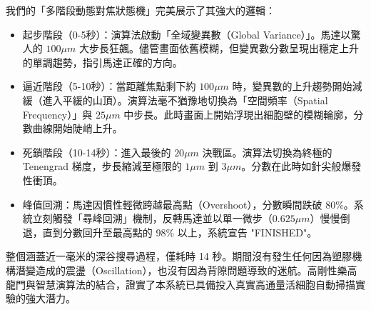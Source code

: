 我們的「多階段動態對焦狀態機」完美展示了其強大的邏輯：
\begin{itemize}
    \item 起步階段（0-5秒）：演算法啟動「全域變異數（Global Variance）」。馬達以驚人的 $100 \mu m$ 大步長狂飆。儘管畫面依舊模糊，但變異數分數呈現出穩定上升的單調趨勢，指引馬達正確的方向。
    \item 逼近階段（5-10秒）：當距離焦點剩下約 $100 \mu m$ 時，變異數的上升趨勢開始減緩（進入平緩的山頂）。演算法毫不猶豫地切換為「空間頻率（Spatial Frequency）」與 $25 \mu m$ 中步長。此時畫面上開始浮現出細胞壁的模糊輪廓，分數曲線開始陡峭上升。
    \item 死鎖階段（10-14秒）：進入最後的 $20 \mu m$ 決戰區。演算法切換為終極的 Tenengrad 梯度，步長縮減至極限的 $1 \mu m$ 到 $3 \mu m$。分數在此時如針尖般爆發性衝頂。
    \item 峰值回溯：馬達因慣性輕微跨越最高點（Overshoot），分數瞬間跌破 80\%。系統立刻觸發「尋峰回溯」機制，反轉馬達並以單一微步（$0.625 \mu m$）慢慢倒退，直到分數回升至最高點的 98\% 以上，系統宣告 "FINISHED"。
\end{itemize}
整個涵蓋近一毫米的深谷搜尋過程，僅耗時 14 秒。期間沒有發生任何因為塑膠機構潛變造成的震盪（Oscillation），也沒有因為背隙問題導致的迷航。高剛性樂高龍門與智慧演算法的結合，證實了本系統已具備投入真實高通量活細胞自動掃描實驗的強大潛力。